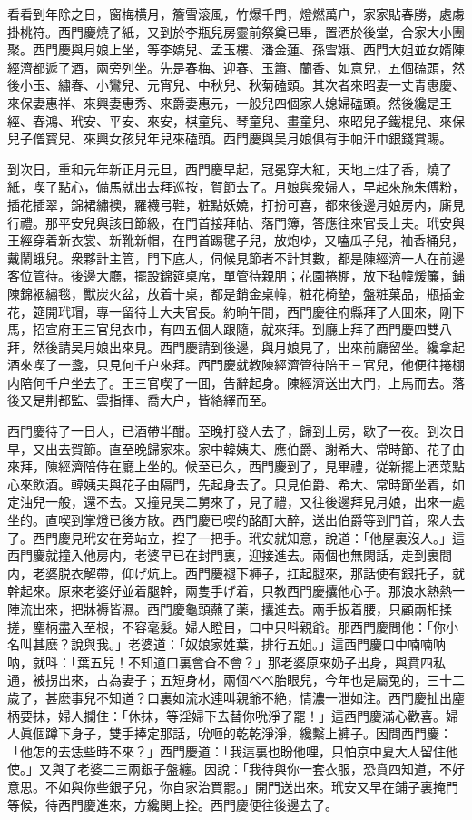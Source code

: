 看看到年除之日，窗梅横月，簷雪滚風，竹爆千門，燈燃萬户，家家貼春勝，處䖏掛桃符。西門慶燒了紙，又到於李瓶兒房靈前祭奠已畢，置酒於後堂，合家大小團聚。西門慶與月娘上坐，等李嬌兒、孟玉樓、潘金蓮、孫雪娥、西門大姐並女婿陳經濟都遞了酒，兩旁列坐。先是春梅、迎春、玉簫、蘭香、如意兒，五個磕頭，然後小玉、繡春、小鸞兒、元宵兒、中秋兒、秋菊磕頭。其次者來昭妻一丈青惠慶、來保妻惠祥、來興妻惠秀、來爵妻惠元，一般兒四個家人媳婦磕頭。然後纔是王經、春鴻、玳安、平安、來安，棋童兒、琴童兒、畫童兒、來昭兒子鐵棍兒、來保兒子僧寳兒、來興女孩兒年兒來磕頭。西門慶與吴月娘俱有手帕汗巾銀錢賞賜。

到次日，重和元年新正月元旦，西門慶早起，冠冕穿大紅，天地上炷了香，燒了紙，喫了點心，備馬就出去拜巡按，賀節去了。月娘與衆婦人，早起來施朱傅粉，插花插翠，錦裙繡襖，羅襪弓鞋，粧點妖嬈，打扮可喜，都來後邊月娘房内，廝見行禮。那平安兒與該日節級，在門首接拜帖、落門簿，答應往來官長士夫。玳安與王經穿着新衣裳、新靴新帽，在門首踢毽子兒，放炮ゆ，又嗑瓜子兒，袖香桶兒，戴鬧蛾兒。衆夥計主管，門下底人，伺候見節者不計其數，都是陳經濟一人在前邊客位管待。後邊大廳，擺設錦筵桌席，單管待親朋；花園捲棚，放下毡幃煖簾，鋪陳錦裀繡毯，獸炭火盆，放着十桌，都是銷金桌幃，粧花椅墊，盤粧菓品，瓶插金花，筵開玳瑁，專一留待士大夫官長。約晌午間，西門慶往府縣拜了人囬來，剛下馬，招宣府王三官兒衣巾，有四五個人跟隨，就來拜。到廳上拜了西門慶四雙八拜，然後請吴月娘出來見。西門慶請到後邊，與月娘見了，出來前廳留坐。纔拿起酒來喫了一盞，只見何千户來拜。西門慶就教陳經濟管待陪王三官兒，他便往捲棚内陪何千户坐去了。王三官喫了一囬，告辭起身。陳經濟送出大門，上馬而去。落後又是荆都監、雲指揮、喬大户，皆絡繹而至。

西門慶待了一日人，已酒帶半酣。至晚打發人去了，歸到上房，歇了一夜。到次日早，又出去賀節。直至晚歸家來。家中韓姨夫、應伯爵、謝希大、常時節、花子由來拜，陳經濟陪侍在廳上坐的。候至已久，西門慶到了，見畢禮，従新擺上酒菜點心來飲酒。韓姨夫與花子由隔門，先起身去了。只見伯爵、希大、常時節坐着，如定油兒一般，還不去。又撞見吴二舅來了，見了禮，又往後邊拜見月娘，出來一處坐的。直喫到掌燈已後方散。西門慶已喫的酩酊大醉，送出伯爵等到門首，衆人去了。西門慶見玳安在旁站立，揑了一把手。玳安就知意，說道：「他屋裏沒人。」這西門慶就撞入他房内，老婆早已在封門裏，迎接進去。兩個也無閑話，走到裏間内，老婆脱衣解帶，仰げ炕上。西門慶褪下褲子，扛起腿來，那話使有銀托子，就幹起來。原來老婆好並着腿幹，兩隻手げ着，只教西門慶攮他心子。那浪水熱熱一陣流出來，把牀褥皆濕。西門慶龜頭蘸了薬，攮進去。兩手扳着腰，只顧兩相揉搓，麈柄盡入至根，不容毫髮。婦人瞪目，口中只呌親爺。那西門慶問他：「你小名叫甚麽？說與我。」老婆道：「奴娘家姓葉，排行五姐。」這西門慶口中喃喃呐呐，就呌：「葉五兒！不知道口裏會㒲不會？」那老婆原來奶子出身，與賁四私通，被拐出來，占為妻子；五短身材，兩個べべ胎眼兒，今年也是屬兔的，三十二歲了，甚麽事兒不知道？口裏如流水連叫親爺不絶，情濃一泄如注。西門慶扯出麈柄要抹，婦人攔住：「休抹，等淫婦下去替你吮淨了罷！」這西門慶滿心歡喜。婦人眞個蹲下身子，雙手捧定那話，吮咂的乾乾淨淨，纔繫上褲子。因問西門慶：「他怎的去恁些時不來？」西門慶道：「我這裏也盼他哩，只怕京中夏大人留住他使。」又與了老婆二三兩銀子盤纏。因說：「我待與你一套衣服，恐賁四知道，不好意思。不如與你些銀子兒，你自家治買罷。」開門送出來。玳安又早在鋪子裏掩門等候，待西門慶進來，方纔関上拴。西門慶便往後邊去了。

